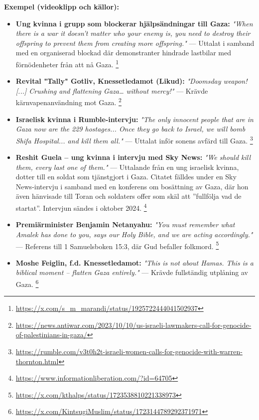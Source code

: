 \vspace{1em}
\textbf{Exempel (videoklipp och källor):}
\begin{itemize}
    \item \textbf{Ung kvinna i grupp som blockerar hjälpsändningar till Gaza:} \textit{"When there is a war it doesn't matter who your enemy is, you need to destroy their offspring to prevent them from creating more offspring."} — Uttalat i samband med en organiserad blockad där demonstranter hindrade lastbilar med förnödenheter från att nå Gaza. \footnote{\url{https://x.com/s_m_marandi/status/1925722444041502937}}

    \item \textbf{Revital "Tally" Gotliv, Knessetledamot (Likud):} \textit{"Doomsday weapon! [...] Crushing and flattening Gaza… without mercy!"} — Krävde kärnvapenanvändning mot Gaza. \footnote{\url{https://news.antiwar.com/2023/10/10/us-israeli-lawmakers-call-for-genocide-of-palestinians-in-gaza/}}

    \item \textbf{Israelisk kvinna i Rumble-intervju:} \textit{"The only innocent people that are in Gaza now are the 229 hostages... Once they go back to Israel, we will bomb Shifa Hospital... and kill them all."} — Uttalat inför sonens avfärd till Gaza. \footnote{\url{https://rumble.com/v3t0h2t-israeli-women-calls-for-genocide-with-warren-thornton.html}}

\item \textbf{Reshit Guela – ung kvinna i intervju med Sky News:} \textit{"We should kill them, every last one of them."} — Uttalande från en ung israelisk kvinna, dotter till en soldat som tjänstgjort i Gaza. Citatet fälldes under en Sky News-intervju i samband med en konferens om bosättning av Gaza, där hon även hänvisade till Toran och soldaters offer som skäl att ”fullfölja vad de startat”. Intervjun sändes i oktober 2024. \footnote{\url{https://www.informationliberation.com/?id=64705}}


    \item \textbf{Premiärminister Benjamin Netanyahu:} \textit{"You must remember what Amalek has done to you, says our Holy Bible, and we are acting accordingly."} — Referens till 1 Samuelsboken 15:3, där Gud befaller folkmord. \footnote{\url{https://x.com/kthalps/status/1723538810221338973}}

    \item \textbf{Moshe Feiglin, f.d. Knessetledamot:} \textit{"This is not about Hamas. This is a biblical moment – flatten Gaza entirely."} — Krävde fullständig utplåning av Gaza. \footnote{\url{https://x.com/KintsugiMuslim/status/1723144789292371971}}


\end{itemize}
